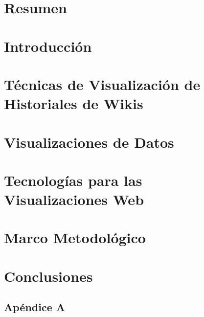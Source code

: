 \documentclass[12pt, twoside]{report}
\begin{document}


\chapter*{Resumen}


\tableofcontents

\listoffigures

\listoftables

\chapter*{Introducción}


\chapter{Técnicas de Visualización de Historiales de Wikis}


\chapter{Visualizaciones de Datos}


\chapter{Tecnologías para las Visualizaciones Web}


\chapter{Marco Metodológico}


\chapter*{Conclusiones}


\begin{appendices}
  \appendixpage
  \addappheadtotoc
  \chapter*{Apéndice A}
  
\end{appendices}

\printbibliography
\end{document}
